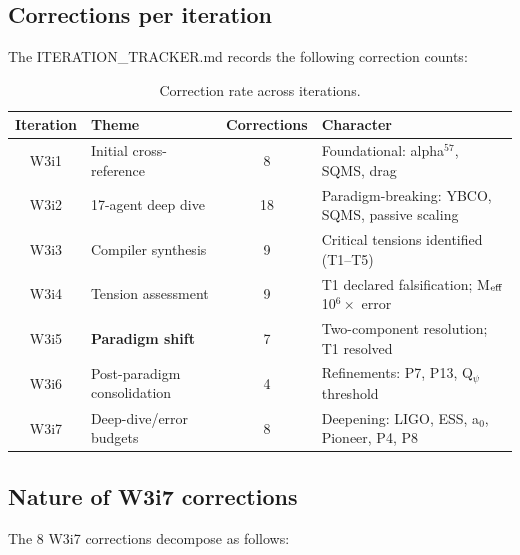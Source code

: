 \documentclass[11pt]{article}
\begin{document}
\subsection{Corrections per iteration}

The ITERATION\_TRACKER.md records the following correction counts:

\begin{table}[H]
\centering
\caption{Correction rate across iterations.}
\label{tab:correction-rate}
\begin{tabular}{clcl}
\toprule
\textbf{Iteration} & \textbf{Theme} & \textbf{Corrections} & \textbf{Character} \\
\midrule
W3i1 & Initial cross-reference & 8 & Foundational: alpha$^{57}$, SQMS, drag \\
W3i2 & 17-agent deep dive & 18 & Paradigm-breaking: YBCO, SQMS, passive scaling \\
W3i3 & Compiler synthesis & 9 & Critical tensions identified (T1--T5) \\
W3i4 & Tension assessment & 9 & T1 declared falsification; M$_{\rm eff}$ 10$^6\times$ error \\
W3i5 & \textbf{Paradigm shift} & 7 & Two-component resolution; T1 resolved \\
W3i6 & Post-paradigm consolidation & 4 & Refinements: P7, P13, Q$_\psi$ threshold \\
W3i7 & Deep-dive/error budgets & 8 & Deepening: LIGO, ESS, a$_0$, Pioneer, P4, P8 \\
\bottomrule
\end{tabular}
\end{table}

\subsection{Nature of W3i7 corrections}

The 8 W3i7 corrections decompose as follows:
\end{document}
